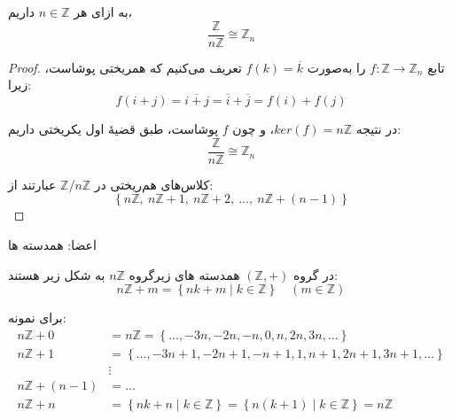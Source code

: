 \begin{frame}
    \begin{example}
        به ازای هر
        \(n \in \mathbb{Z}\)
        داریم،
        \[
            \frac{\mathbb{Z}}{n\mathbb{Z}} \cong \mathbb{Z}_n
        \]


    \end{example}

    \begin{proof}
        تابع $f \colon \mathbb{Z} \to \mathbb{Z}_n$ را به‌صورت $f(k) = \overline{k}$ تعریف می‌کنیم که همریختی پوشاست، زیرا:
        \[
            f(i + j) = \overline{i + j} = \overline{i} + \overline{j} = f(i) + f(j)
        \]

        در نتیجه $ker(f) = n\mathbb{Z}$، و چون $f$ پوشاست، طبق قضیهٔ اول یکریختی داریم:
        \[
            \frac{\mathbb{Z}}{n\mathbb{Z}} \cong \mathbb{Z}_n
        \]

        کلاس‌های هم‌ریختی در $\mathbb{Z}/n\mathbb{Z}$ عبارتند از:
        \[
            \left\{ n\mathbb{Z},\ n\mathbb{Z}+1,\ n\mathbb{Z}+2,\ \ldots,\ n\mathbb{Z}+(n-1) \right\}
        \]
    \end{proof}


\end{frame}

\begin{frame}

    \begin{remark}
        اعضا: همدسته ها

        در گروه $(\mathbb{Z}, +)$ همدسته های زیرگروه $n\mathbb{Z}$ به شکل زیر هستند:
        \[
            n\mathbb{Z} + m = \left\{ nk + m \mid k \in \mathbb{Z} \right\} \quad (m \in \mathbb{Z})
        \]

        برای نمونه:
        \begin{align*}
            n\mathbb{Z} + 0     & = n\mathbb{Z} = \left\{ \ldots, -3n, -2n, -n, 0, n, 2n, 3n, \ldots \right\}                                   \\
            n\mathbb{Z} + 1     & = \left\{ \ldots, -3n+1, -2n+1, -n+1, 1, n+1, 2n+1, 3n+1, \ldots \right\}                                     \\
                                & \vdots                                                                                                        \\
            n\mathbb{Z} + (n-1) & = \ldots                                                                                                      \\
            n\mathbb{Z} + n     & = \left\{ nk + n \mid k \in \mathbb{Z} \right\} = \left\{ n(k+1) \mid k \in \mathbb{Z} \right\} = n\mathbb{Z}
        \end{align*}
    \end{remark}


\end{frame}


